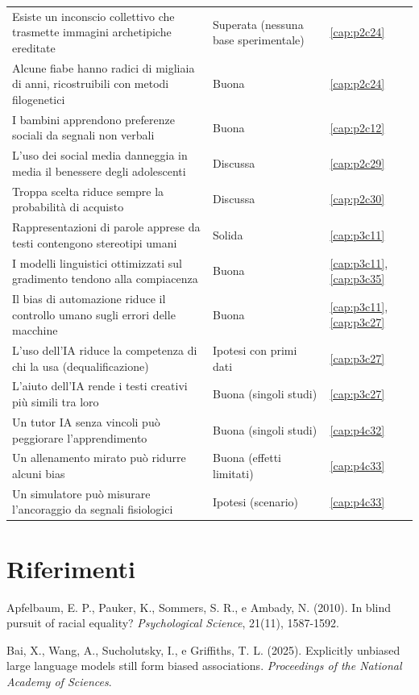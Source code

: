 {\begin{longtable}{p{}p{}p{}}
Esiste un inconscio collettivo che trasmette immagini archetipiche ereditate & Superata (nessuna base sperimentale) & \ref{cap:p2c24}\\
Alcune fiabe hanno radici di migliaia di anni, ricostruibili con metodi filogenetici & Buona & \ref{cap:p2c24}\\
I bambini apprendono preferenze sociali da segnali non verbali & Buona & \ref{cap:p2c12}\\
L'uso dei social media danneggia in media il benessere degli adolescenti & Discussa & \ref{cap:p2c29}\\
Troppa scelta riduce sempre la probabilità di acquisto & Discussa & \ref{cap:p2c30}\\
Rappresentazioni di parole apprese da testi contengono stereotipi umani & Solida & \ref{cap:p3c11}\\
I modelli linguistici ottimizzati sul gradimento tendono alla compiacenza & Buona & \ref{cap:p3c11}, \ref{cap:p3c35}\\
Il bias di automazione riduce il controllo umano sugli errori delle macchine & Buona & \ref{cap:p3c11}, \ref{cap:p3c27}\\
L'uso dell'IA riduce la competenza di chi la usa (dequalificazione) & Ipotesi con primi dati & \ref{cap:p3c27}\\
L'aiuto dell'IA rende i testi creativi più simili tra loro & Buona (singoli studi) & \ref{cap:p3c27}\\
Un tutor IA senza vincoli può peggiorare l'apprendimento & Buona (singoli studi) & \ref{cap:p4c32}\\
Un allenamento mirato può ridurre alcuni bias & Buona (effetti limitati) & \ref{cap:p4c33}\\
Un simulatore può misurare l'ancoraggio da segnali fisiologici & Ipotesi (scenario) & \ref{cap:p4c33}\\
\bottomrule
\end{longtable}
}

\section*{Riferimenti}

\begingroup
\small
\setlength{\parindent}{-1.5em}
\setlength{\leftskip}{1.5em}
\setlength{\parskip}{0.35em}

Apfelbaum, E. P., Pauker, K., Sommers, S. R., e Ambady, N. (2010). In blind pursuit of racial equality? \textit{Psychological Science}, 21(11), 1587-1592.

Bai, X., Wang, A., Sucholutsky, I., e Griffiths, T. L. (2025). Explicitly unbiased large language models still form biased associations. \textit{Proceedings of the National Academy of Sciences}.


